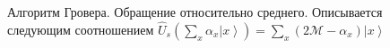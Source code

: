 \begin{figure}
\centering



\caption{Алгоритм Гровера. Обращение относительно
  среднего. Описывается следующим соотношением 
$\hat{U}_s\left(\sum_x \alpha_x \left|x\right>\right) = 
\sum_x \left(2 \mathcal{M} - \alpha_x \right)\left|x\right>$}
\label{figQuantCompGroverInvMiddle}
\end{figure}
